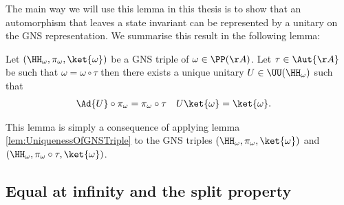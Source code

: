 The main way we will use this lemma in this thesis is to show that an automorphism that leaves a state invariant can be represented by a unitary on the GNS representation. We summarise this result in the following lemma:
\begin{lemma}
	Let $(\HH_\omega,\pi_\omega,\ket{\omega})$ be a GNS triple of $\omega\in\PP(\AA)$. Let $\tau\in\Aut{\AA}$ be such that $\omega=\omega\circ\tau$ then there exists a unique unitary $U\in\UU(\HH_\omega)$ such that
	\begin{align}
		\Ad{U}\circ\pi_\omega&=\pi_\omega\circ\tau&U\ket{\omega}&=\ket{\omega}.
	\end{align}
\end{lemma}
This lemma is simply a consequence of applying lemma \ref{lem:UniquenessOfGNSTriple} to the GNS triples $(\HH_\omega,\pi_\omega,\ket{\omega})$ and $(\HH_\omega,\pi_\omega\circ\tau,\ket{\omega})$.
\subsection{Equal at infinity and the split property}